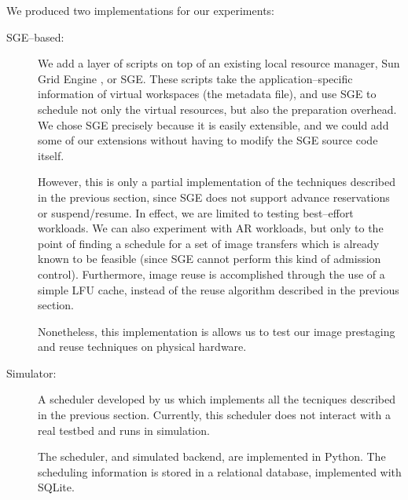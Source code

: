 We produced two implementations for our experiments:

\begin{description}
\item[SGE--based:] We add a layer of scripts on top of an existing local resource manager, Sun Grid Engine
\cite{sgeweb}, or SGE. These scripts take the application--specific information of virtual workspaces (the metadata file), and use SGE to schedule not only the virtual resources, but also the preparation overhead. We chose SGE precisely because it is easily extensible, and we could add some of our extensions without having to modify the SGE source code itself.

However, this is only a partial implementation of the techniques described in the previous section, since SGE does not support advance reservations or suspend/resume. In effect, we are limited to testing best--effort workloads. We can also experiment with AR workloads, but only to the point of finding a schedule for a set of image transfers which is already known to be feasible (since SGE cannot perform this kind of admission control). Furthermore, image reuse is accomplished through the use of a simple LFU cache, instead of the reuse algorithm described in the previous section.

Nonetheless, this implementation is allows us to test our image prestaging and reuse techniques on physical hardware.
\item[Simulator:] A scheduler developed by us which implements all the tecniques described in the previous section. Currently, this scheduler does not interact with a real testbed and runs in simulation. 

The scheduler, and simulated backend, are implemented in Python. The scheduling information is stored in a relational database, implemented with SQLite. 
\end{description}